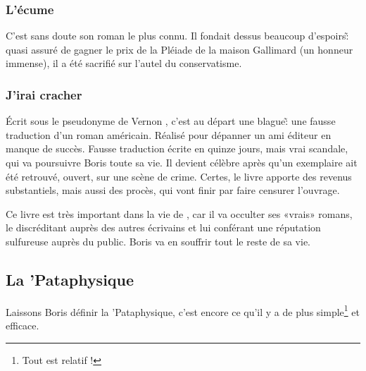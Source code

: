\subsubsection{L'écume}

C'est sans doute son roman le plus connu. Il fondait dessus beaucoup d'espoirs\~: quasi
assuré de gagner le prix de la Pléiade de la maison Gallimard (un honneur immense),
il a été sacrifié sur l'autel du conservatisme.

\subsubsection{J'irai cracher}

Écrit sous le pseudonyme de Vernon , c'est au départ une blague\~: une fausse
traduction d'un roman américain. Réalisé pour dépanner un ami éditeur en manque de succès.
Fausse traduction écrite en quinze jours, mais vrai scandale, qui va poursuivre Boris
toute sa vie. Il devient célèbre après qu'un exemplaire ait été retrouvé, ouvert, sur une scène de crime.
Certes, le livre apporte des revenus substantiels, mais aussi des procès, qui
vont finir par faire censurer l'ouvrage.


Ce livre est très important dans la vie de \BV, car il va occulter ses «vrais» romans,
le discréditant auprès des autres écrivains et lui conférant une réputation sulfureuse
auprès du public. Boris va en souffrir tout le reste de sa vie.

\subsection{La 'Pataphysique}

Laissons Boris définir la 'Pataphysique, c'est encore ce qu'il y
a de plus simple\footnote{Tout est relatif !} et efficace.

